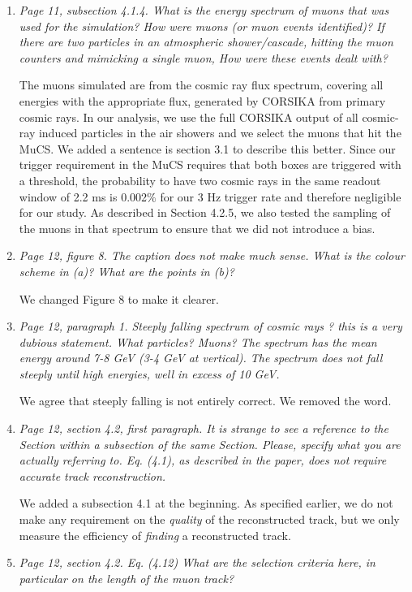 \documentclass[review,number,sort&compress]{article}
\begin{document}
\begin{enumerate}
\item \emph{Page 11, subsection 4.1.4.
What is the energy spectrum of muons that was used for the simulation? How were muons (or muon events identified)? If there are two particles in an atmospheric shower/cascade, hitting the muon counters and mimicking a single muon, How were these events dealt with?}

The muons simulated are from  the cosmic ray flux spectrum, covering all energies with the appropriate flux, generated by CORSIKA from primary cosmic rays. In our analysis, we use the full CORSIKA output of all cosmic-ray induced particles in the air showers and we select the muons that hit the MuCS.  We added a sentence is section 3.1 to describe this better. Since our trigger requirement in the MuCS requires that both boxes are triggered with a threshold, the probability to have two cosmic rays in the same readout window of 2.2 ms is 0.002$\%$ for our 3 Hz trigger rate and therefore negligible for our study. 
As described in Section 4.2.5, we also tested the sampling of the muons in that spectrum to ensure that we did not introduce a bias.

\item \emph{Page 12, figure 8. 
The caption does not make much sense. What is the colour scheme in (a)? What are the points in (b)?}

We changed Figure 8 to make it clearer.

\item \emph{Page 12, paragraph 1.
Steeply falling spectrum of cosmic rays ? this is a very dubious statement. What particles? Muons? The spectrum has the mean energy around 7-8 GeV (3-4 GeV at vertical). The spectrum does not fall steeply until high energies, well in excess of 10 GeV.}

We agree that steeply falling is not entirely correct. We removed the word.

\item \emph{Page 12, section 4.2, first paragraph.
It is strange to see a reference to the Section within a subsection of the same Section. Please, specify what you are actually referring to. Eq. (4.1), as described in the paper, does not require accurate track reconstruction.}

We added a subsection 4.1 at the beginning. As specified earlier, we do not make any requirement on the \emph{quality} of the reconstructed track, but we only measure the efficiency of \emph{finding} a reconstructed track.

\item \emph{Page 12, section 4.2. Eq. (4.12)
What are the selection criteria here, in particular on the length of the muon track?}


\end{enumerate}
\end{document}
